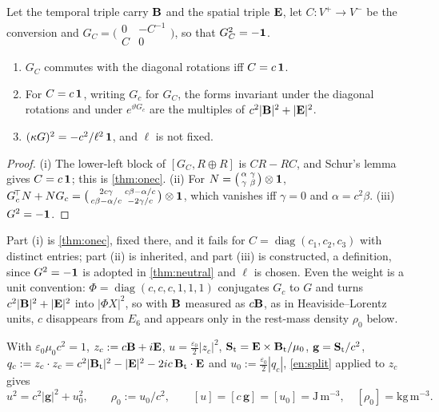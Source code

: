 \begin{proposition}
\label{en:onec}
Let the temporal triple carry $\mathbf B$ and the spatial triple $\mathbf E$, let $C:V^+\to V^-$ be the conversion and
$G_C=\bigl(\begin{smallmatrix}0&-C^{-1}\\ C&0\end{smallmatrix}\bigr)$, so that $G_C^2=-\mathbf 1$.
\begin{enumerate}[label=(\roman*),leftmargin=2.2em]
\item $G_C$ commutes with the diagonal rotations iff $C=c\,\mathbf 1$.
\item For $C=c\,\mathbf 1$, writing $G_c$ for $G_C$, the forms invariant under the diagonal rotations and under $e^{\vartheta G_c}$ are the multiples of $c^2|\mathbf B|^2+|\mathbf E|^2$.
\item $(\kappa G)^2=-c^2/\ell^2\,\mathbf 1$, and $\ell$ is not fixed.
\end{enumerate}
\end{proposition}

\begin{proof}
(i) The lower-left block of $[G_C,R\oplus R]$ is $CR-RC$, and Schur's lemma gives $C=c\,\mathbf 1$; this is \cref{thm:onec}. (ii) For
$N=\bigl(\begin{smallmatrix}\alpha&\gamma\\ \gamma&\beta\end{smallmatrix}\bigr)\otimes\mathbf 1$,
$G_c^{\!\top}N+NG_c=\bigl(\begin{smallmatrix}2c\gamma&c\beta-\alpha/c\\ c\beta-\alpha/c&-2\gamma/c\end{smallmatrix}\bigr)\otimes\mathbf 1$, which vanishes iff
$\gamma=0$ and $\alpha=c^2\beta$. (iii) $G^2=-\mathbf 1$.
\end{proof}

Part (i) is \cref{thm:onec}, fixed there, and it fails for $C=\operatorname{diag}(c_1,c_2,c_3)$ with distinct entries; part (ii) is inherited, and
part (iii) is constructed, a definition, since $G^2=-\mathbf 1$ is adopted in \cref{thm:neutral} and $\ell$ is chosen. Even the weight is a unit convention: $\Phi=\operatorname{diag}(c,c,c,1,1,1)$
conjugates $G_c$ to $G$ and turns $c^2|\mathbf B|^2+|\mathbf E|^2$ into $|\Phi X|^2$, so with $\mathbf B$ measured as $c\mathbf B$, as in Heaviside--Lorentz units, $c$
disappears from $E_6$ and appears only in the rest-mass density $\rho_0$ below.

\begin{proposition}[SI form]
\label{en:SI}
With $\varepsilon_0\mu_0c^2=1$, $z_c:=c\mathbf B+i\mathbf E$, $u=\tfrac{\varepsilon_0}2|z_c|^2$, $\mathbf S_{\rm t}=\mathbf E\times\mathbf B_{\rm t}/\mu_0$, $\mathbf g=\mathbf S_{\rm t}/c^2$,
$q_c:=z_c\cdot z_c=c^2|\mathbf B_{\rm t}|^2-|\mathbf E|^2-2ic\,\mathbf B_{\rm t}\cdot\mathbf E$ and $u_0:=\tfrac{\varepsilon_0}2|q_c|$, \cref{en:split} applied to $z_c$ gives
\begin{equation}
\label{en:SIeq}
u^2=c^2|\mathbf g|^2+u_0^2,\qquad \rho_0:=u_0/c^2,\qquad [u]=[c\,\mathbf g]=[u_0]=\mathrm{J\,m^{-3}},\quad [\rho_0]=\mathrm{kg\,m^{-3}} .
\end{equation}
\end{proposition}

